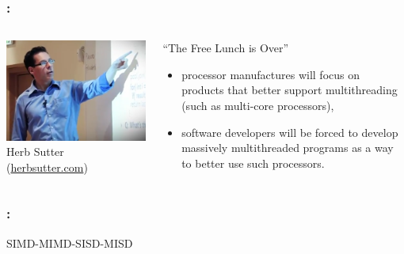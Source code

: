\documentclass[9pt,xcolor=table]{beamer}
\begin{document}
\begin{frame}
\frametitle{\insertsectionhead{}: \insertsubsectionhead{}}
\begin{columns}[c]
  \begin{column}{.35\textwidth}
    \begin{center}
      \includegraphics[width=\textwidth]{img/herb_sutter}\\[6pt]
      Herb Sutter (\href{http://herbsutter.com/about/}{herbsutter.com})
    \end{center}
  \end{column}
    \begin{column}{.6\textwidth}
      \begin{block}{``The Free Lunch is Over'' \cite{Sutter}}
        \begin{itemize}
        \item processor manufactures will focus on products that
          better support multithreading (such as multi-core
          processors),
        \item software developers will be forced to
          develop massively multithreaded programs as a way to better
          use such processors.
        \end{itemize}
      \end{block}
    \end{column}
  \end{columns}
\end{frame}

\begin{frame}
\frametitle{\insertsectionhead{}: \insertsubsectionhead{}}
SIMD-MIMD-SISD-MISD
\end{frame}
\end{document}
